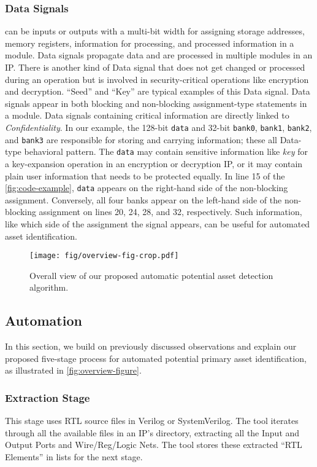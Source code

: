 \subsubsection{Data Signals} can be inputs or outputs with a multi-bit width for assigning storage addresses, memory registers, information for processing, and processed information in a module.
Data signals propagate data and are processed in multiple modules in an \ac{IP}.
There is another kind of Data signal that does not get changed or processed during an operation but is involved in security-critical operations like encryption and decryption. ``Seed'' and ``Key'' are typical examples of this Data signal. 
Data signals appear in both blocking and non-blocking assignment-type statements in a module.
Data signals containing critical information are directly linked to \textit{Confidentiality}.
In our example, the 128-bit \texttt{data} and 32-bit \texttt{bank0}, \texttt{bank1}, \texttt{bank2}, and \texttt{bank3} are responsible for storing and carrying information; these all Data-type behavioral pattern.
The \texttt{data} may contain sensitive information like \textit{key} for a key-expansion operation in an encryption or decryption IP, or it may contain plain user information that needs to be protected equally. 
In line 15 of the \autoref{fig:code-example}, \texttt{data} appears on the right-hand side of the non-blocking assignment.
Conversely, all four banks appear on the left-hand side of the non-blocking assignment on lines 20, 24, 28, and 32, respectively. 
Such information, like which side of the assignment the signal appears, can be useful for automated asset identification. 

\begin{figure*}[t]
    \centering
    \texttt{[image: fig/overview-fig-crop.pdf]}
    \caption{Overall view of our proposed automatic potential asset detection algorithm.}
    \label{fig:overview-figure}
\end{figure*}


\subsection{Automation}
In this section, we build on previously discussed observations and explain our proposed five-stage process for automated potential primary asset identification, as illustrated in \autoref{fig:overview-figure}. 

\subsubsection{Extraction Stage}
This stage uses RTL source files in Verilog or SystemVerilog. The tool iterates through all the available files in an \ac{IP}'s directory, extracting all the Input and Output Ports and Wire/Reg/Logic Nets. The tool stores these extracted ``RTL Elements'' in lists for the next stage. 

